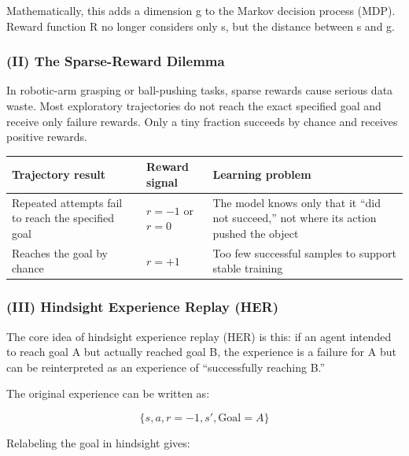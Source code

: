 Mathematically, this adds a dimension g to the Markov decision process (MDP). Reward function R no longer considers only s, but the distance between s and g.

\hypertarget{ii-the-sparse-reward-dilemma}{%
\subsubsection{(II) The Sparse-Reward Dilemma}\label{ii-the-sparse-reward-dilemma}}

In robotic-arm grasping or ball-pushing tasks, sparse rewards cause serious data waste. Most exploratory trajectories do not reach the exact specified goal and receive only failure rewards. Only a tiny fraction succeeds by chance and receives positive rewards.

\begin{longtable}[]{@{}
  >{\raggedright\arraybackslash}p{}
  >{\raggedright\arraybackslash}p{}
  >{\raggedright\arraybackslash}p{}@{}}
\toprule
Trajectory result & Reward signal & Learning problem \\
\midrule
\endhead
Repeated attempts fail to reach the specified goal & \(r=-1\) or \(r=0\) & The model knows only that it ``did not succeed,'' not where its action pushed the object \\
Reaches the goal by chance & \(r=+1\) & Too few successful samples to support stable training \\
\bottomrule
\end{longtable}

\hypertarget{iii-hindsight-experience-replay-her}{%
\subsubsection{(III) Hindsight Experience Replay (HER)}\label{iii-hindsight-experience-replay-her}}

The core idea of hindsight experience replay (HER) is this: if an agent intended to reach goal A but actually reached goal B, the experience is a failure for A but can be reinterpreted as an experience of ``successfully reaching B.''

The original experience can be written as:

\[
\{s,a,r=-1,s',\mathrm{Goal}=A\}
\]

Relabeling the goal in hindsight gives:

